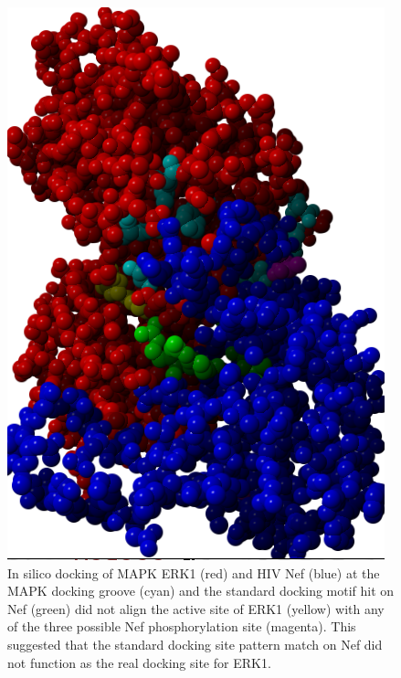 \begin{figure}
\begin{center}
\includegraphics[scale=0.9]{figs/plos1_new_6}
\end{center}
\caption[Docking between MAPK ERK1 and HIV Nef]{\small In silico
  docking of MAPK ERK1 (red) and HIV Nef (blue) at the MAPK docking
  groove (cyan) and the standard docking motif hit on Nef (green) did
  not align the active site of ERK1 (yellow) with any of the three
  possible Nef phosphorylation site (magenta). This suggested that the
  standard docking site pattern match on Nef did not function as the
  real docking site for ERK1. \label{fig:plos1:new}}
\end{figure}

